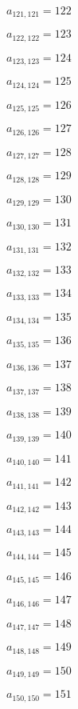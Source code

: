 \documentclass[a4paper,12pt]{article}
\begin{document}
$a _{ 121, 121 } = 122$

$a _{ 122, 122 } = 123$

$a _{ 123, 123 } = 124$

$a _{ 124, 124 } = 125$

$a _{ 125, 125 } = 126$

$a _{ 126, 126 } = 127$

$a _{ 127, 127 } = 128$

$a _{ 128, 128 } = 129$

$a _{ 129, 129 } = 130$

$a _{ 130, 130 } = 131$

$a _{ 131, 131 } = 132$

$a _{ 132, 132 } = 133$

$a _{ 133, 133 } = 134$

$a _{ 134, 134 } = 135$

$a _{ 135, 135 } = 136$

$a _{ 136, 136 } = 137$

$a _{ 137, 137 } = 138$

$a _{ 138, 138 } = 139$

$a _{ 139, 139 } = 140$

$a _{ 140, 140 } = 141$

$a _{ 141, 141 } = 142$

$a _{ 142, 142 } = 143$

$a _{ 143, 143 } = 144$

$a _{ 144, 144 } = 145$

$a _{ 145, 145 } = 146$

$a _{ 146, 146 } = 147$

$a _{ 147, 147 } = 148$

$a _{ 148, 148 } = 149$

$a _{ 149, 149 } = 150$

$a _{ 150, 150 } = 151$
\end{document}
